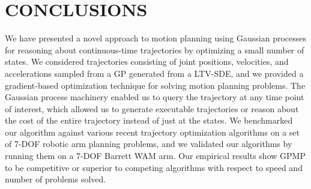 \documentclass{IEEEtran}
\begin{document}
\section{CONCLUSIONS}
We have presented a novel approach to motion planning
using Gaussian processes for reasoning about continuous-time trajectories by optimizing a small number of states. We
considered trajectories consisting of joint positions, velocities, and accelerations sampled from a GP generated from
a LTV-SDE, and we provided a gradient-based optimization
technique for solving motion planning problems. The Gaussian process machinery enabled us to query the trajectory
at any time point of interest, which allowed us to generate
executable trajectories or reason about the cost of the entire
trajectory instead of just at the states. We benchmarked
our algorithm against various recent trajectory optimization
algorithms on a set of 7-DOF robotic arm planning problems,
and we validated our algorithms by running them on a 7-DOF
Barrett WAM arm. Our empirical results show GPMP to be
competitive or superior to competing algorithms with respect
to speed and number of problems solved.
\newpage

\cite{khatib1986real}
\cite{mabrouk2008solving}
\cite{chuang1998analytically}
\cite{ratliff2009chomp}
\cite{zucker2013chomp}
\cite{kalakrishnan2011stomp}
\cite{he2013multigrid}
\cite{schulman2013finding}
\cite{rasmussengaussian}
\cite{vijayakumar2005incremental}
\cite{kersting2007most}
\cite{nguyen2008learning}
\cite{sturm2009body}
\cite{deisenroth2011pilco}
\cite{tay2008modelling}
\cite{barfoot2014batch}

\end{document}
